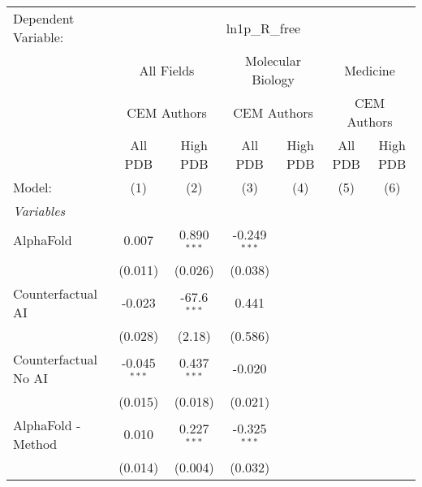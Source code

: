 \begingroup
\centering
\begin{tabular}{lcccccc}
   \tabularnewline \midrule \midrule
   Dependent Variable: & \multicolumn{6}{c}{ln1p\_R\_free}\\
 & \multicolumn{2}{c}{All Fields} & \multicolumn{2}{c}{Molecular Biology} & \multicolumn{2}{c}{Medicine} \\
\cmidrule(lr){2-3} \cmidrule(lr){4-5} \cmidrule(lr){6-7}
 & \multicolumn{2}{c}{CEM Authors} & \multicolumn{2}{c}{CEM Authors} & \multicolumn{2}{c}{CEM Authors} \\
\cmidrule(lr){2-3} \cmidrule(lr){4-5} \cmidrule(lr){6-7}
 & \multicolumn{1}{c}{All PDB} & \multicolumn{1}{c}{High PDB} & \multicolumn{1}{c}{All PDB} & \multicolumn{1}{c}{High PDB} & \multicolumn{1}{c}{All PDB} & \multicolumn{1}{c}{High PDB} \\
\cmidrule(lr){2-2} \cmidrule(lr){3-3} \cmidrule(lr){4-4} \cmidrule(lr){5-5} \cmidrule(lr){6-6} \cmidrule(lr){7-7}
   Model:                                                     & (1)            & (2)           & (3)            & (4) & (5) & (6)\\  
   \midrule
   \emph{Variables}\\
   AlphaFold                                                  & 0.007          & 0.890$^{***}$ & -0.249$^{***}$ &     &     &   \\   
                                                              & (0.011)        & (0.026)       & (0.038)        &     &     &   \\   
   Counterfactual AI                                          & -0.023         & -67.6$^{***}$ & 0.441          &     &     &   \\   
                                                              & (0.028)        & (2.18)        & (0.586)        &     &     &   \\   
   Counterfactual No AI                                       & -0.045$^{***}$ & 0.437$^{***}$ & -0.020         &     &     &   \\   
                                                              & (0.015)        & (0.018)       & (0.021)        &     &     &   \\   
   AlphaFold - Method                                         & 0.010          & 0.227$^{***}$ & -0.325$^{***}$ &     &     &   \\   
                                                              & (0.014)        & (0.004)       & (0.032)        &     &     &   \\   

\end{tabular}
